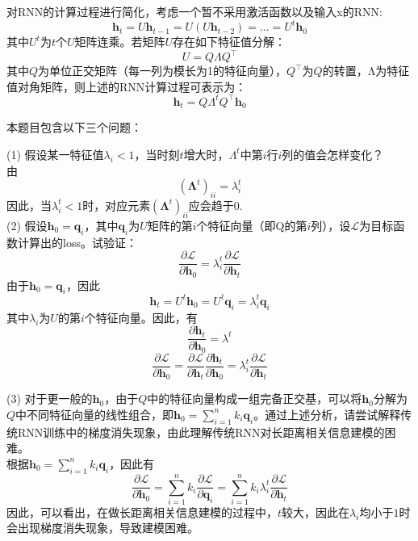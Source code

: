 \documentclass[a4paper]{article}
\begin{document}
\hspace{2em}对RNN的计算过程进行简化，考虑一个暂不采用激活函数以及输入x的RNN:
\begin{equation*}
    \bm{h}_t = U\bm{h}_{t-1} = U \left( U\bm{h}_{t-2} \right) = ... = U^t\bm{h}_0
\end{equation*}
\hspace{2em}其中$U^t$为$t$个$U$矩阵连乘。若矩阵$U$存在如下特征值分解：
\begin{equation*}
    U = Q \Lambda Q^\top
\end{equation*}
\hspace{2em}其中$Q$为单位正交矩阵（每一列为模长为1的特征向量），$Q^\top$为$Q$的转置，Λ为特征值对角矩阵，则上述的RNN计算过程可表示为：
\begin{equation*}
    \bm{h}_t = Q \Lambda^t Q^\top \bm{h}_0
\end{equation*}

\vspace{3mm}
本题目包含以下三个问题：

(1) 假设某一特征值$\lambda_i < 1$，{\color{blue}当时刻$t$增大时，$\Lambda^t$中第$i$行$i$列的值会怎样变化？}\\
由
$$ \left( \mathbf{\Lambda}^t \right)_{ii} = \lambda_i^t $$
因此，当$ \lambda_i^t < 1 $时，对应元素$ \left( \mathbf{\Lambda}^t \right)_{ii} $应会趋于$ 0 $.\\

(2) 假设$\bm{h}_0=\bm{q}_i$，其中$\bm{q}_i$为$U$矩阵的第$i$个特征向量（即Q的第$i$列），设$\mathcal{L}$为目标函数计算出的loss。{\color{blue}试验证：
\begin{equation*}
    \frac{\partial \mathcal{L}}{\partial \bm{h}_0} = \lambda_i^t \frac{\partial \mathcal{L}}{\partial \bm{h}_t}
\end{equation*}}
由于$ \bm{h}_0=\bm{q}_i $，因此
$$ \bm{h}_t = U^t \bm{h}_0 = U^t \bm{q}_i = \lambda_i^t \bm{q}_i $$
其中$ \lambda_i $为$ U $的第$ i $个特征向量。因此，有
$$ \frac{\partial \bm{h}_t}{\partial \bm{h}_0} = \lambda^t $$
$$ \frac{\partial \mathcal{L}}{\partial \bm{h}_0} = \frac{\partial \mathcal{L}}{\partial \bm{h}_t} \frac{\partial \bm{h}_t}{\partial \bm{h}_0} = \lambda_i^t \frac{\partial \mathcal{L}}{\partial \bm{h}_t} $$

(3) 对于更一般的$\bm{h}_0$，由于$Q$中的特征向量构成一组完备正交基，可以将$\bm{h}_0$分解为$Q$中不同特征向量的线性组合，即$\bm{h}_0=\sum_{i=1}^{n}k_i\bm{q}_i$。通过上述分析，{\color{blue}请尝试解释传统RNN训练中的梯度消失现象}，由此理解传统RNN对长距离相关信息建模的困难。\\
根据$ \bm{h}_0 = \sum_{i=1}^{n} k_i \bm{q}_i $，因此有
$$ \frac{\partial \mathcal{L}}{\partial \bm{h}_0} = \sum_{i=1}^{n} k_i \frac{\partial \mathcal{L}}{\partial \bm{q}_i} = \sum_{i=1}^n k_i \lambda_i^t \frac{\partial \mathcal{L}}{\partial \bm{h}_t} $$
因此，可以看出，在做长距离相关信息建模的过程中，$ t $较大，因此在$ \lambda_i $均小于$ 1 $时会出现梯度消失现象，导致建模困难。\\
\end{document}
